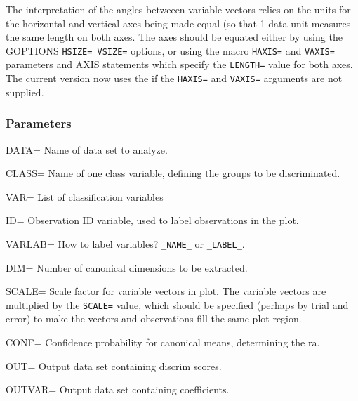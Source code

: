 The interpretation of the angles betweeen variable vectors
relies on the units for the horizontal and vertical axes being made
equal (so that 1 data unit measures the same length on both axes.
The axes should be equated either by using the GOPTIONS \texttt{HSIZE= VSIZE=}
options, or using the macro \texttt{HAXIS=} and \texttt{VAXIS=} parameters
and AXIS statements which specify the \texttt{LENGTH=} value for both
axes. The current version now uses the  if the 
\texttt{HAXIS=} and \texttt{VAXIS=} arguments are not supplied.

\subsubsection*{Parameters}
\begin{proglist}

\item[DATA=] Name of data set to analyze. 

\item[CLASS=] Name of one class variable, defining the groups to be
discriminated.

\item[VAR=] List of classification variables

\item[ID=] Observation ID variable, used to label observations in the plot.

\item[VARLAB=] How to label variables? \verb|_NAME_| or \verb|_LABEL_|. 

\item[DIM=] Number of canonical dimensions to be extracted. 

\item[SCALE=] Scale factor for variable vectors in plot. The variable 
vectors are multiplied by the \texttt{SCALE=} value, which should
be specified (perhaps by trial and error) to make the vectors and
observations fill the same plot region. 

\item[CONF=] Confidence probability for canonical means, determining the ra. 

\item[OUT=] Output data set containing discrim scores. 

\item[OUTVAR=] Output data set containing coefficients. 


\end{proglist}
